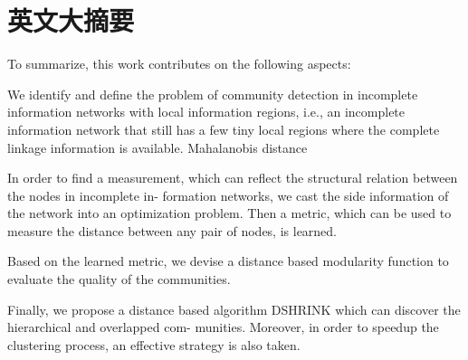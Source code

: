 \chapter{英文大摘要}
\label{chap:updatelog}

To summarize, this
work contributes on the following aspects:

We identify and define the problem of community detection in incomplete information networks with local
information regions, i.e., an incomplete information
network that still has a few tiny local regions where
the complete linkage information is available.
Mahalanobis distance

In order to find a measurement, which can reflect the
structural relation between the nodes in incomplete in-
formation networks, we cast the side information of the
network into an optimization problem. Then a metric,
which can be used to measure the distance between
any pair of nodes, is learned.

Based on the learned metric, we devise a distance based modularity function to evaluate the quality of
the communities.

Finally, we propose a distance based algorithm DSHRINK
which can discover the hierarchical and overlapped com-
munities. Moreover, in order to speedup the clustering
process, an effective strategy is also taken.

